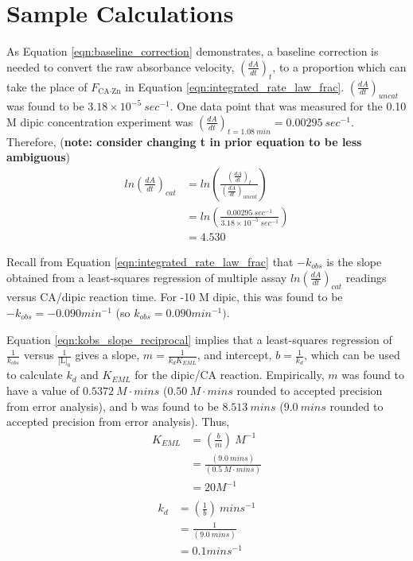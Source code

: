 \section{Sample Calculations}
As Equation \eqref{eqn:baseline_correction} demonstrates, a baseline correction is needed to convert the raw absorbance velocity, $\left(\frac{dA}{dt}\right)_{t}$, to a proportion which can take the place of $F_\text{CA$\cdot$Zn}$ in Equation \eqref{eqn:integrated_rate_law_frac}. $\left(\frac{dA}{dt}\right)_{uncat}$ was found to be $3.18\times10^{-5}\ sec^{-1}$. One data point that was measured for the 0.10 M dipic concentration experiment was $\left(\frac{dA}{dt}\right)_{t=1.08\ min}=0.00295\ sec^{-1}$. Therefore, (\textbf{note: consider changing t in prior equation to be less ambiguous})
\begin{equation*}
\begin{split}
ln \left(\frac{dA}{dt}\right)_{cat}
&= ln \left( \frac{ \left (\frac{dA}{dt}\right)_{t} }{ \left (\frac{dA}{dt}\right)_{uncat} } \right) \\
&= ln \left( \frac{ 0.00295\ sec^{-1} }{ 3.18\times10^{-5}\ sec^{-1} } \right) \\
&= 4.530
\end{split}
\end{equation*}

Recall from Equation \eqref{eqn:integrated_rate_law_frac} that $-k_{obs}$ is the slope obtained from a least-squares regression of multiple assay $ln \left(\frac{dA}{dt}\right)_{cat}$ readings versus CA/dipic reaction time. For -10 M dipic, this was found to be $-k_{obs}=-0.090 min^{-1}$ (so $k_{obs}=0.090 min^{-1})$.

Equation \eqref{eqn:kobs_slope_reciprocal} implies that a least-squares regression of $\frac{1}{k_{obs}}$ versus $\frac{1}{\text{[L]}_0}$ gives a slope, $m=\frac{1}{k_{d}K_{EML}}$, and intercept, $b=\frac{1}{k_{d}}$, which can be used to calculate $k_d$ and $K_{EML}$ for the dipic/CA reaction. Empirically, $m$ was found to have a value of $0.5372\ M\cdot{mins}$ ($0.50\ M\cdot{mins}$ rounded to accepted precision from error analysis), and b was found to be $8.513\ mins$ ($9.0\ mins$ rounded to accepted precision from error analysis). Thus,
\begin{equation}\label{eqn:samp_calc_keml}
\begin{split}
K_{EML}&=\left(\frac{b}{m}\right){\ }M^{-1}\\
&=\frac{\left (9.0{\ }mins\right )}{\left (0.5{\ }M\cdot{mins}\right )}\\
&=20M^{-1}\\
\end{split}
\end{equation}
\begin{equation}\label{eqn:samp_calc_kd}
\begin{split}
k_{d}&=\left(\frac{1}{b}\right){\ }mins^{-1}\\
&=\frac{1}{\left (9.0{\ }mins\right )}\\
&=0.1mins^{-1}\\
\end{split}
\end{equation}